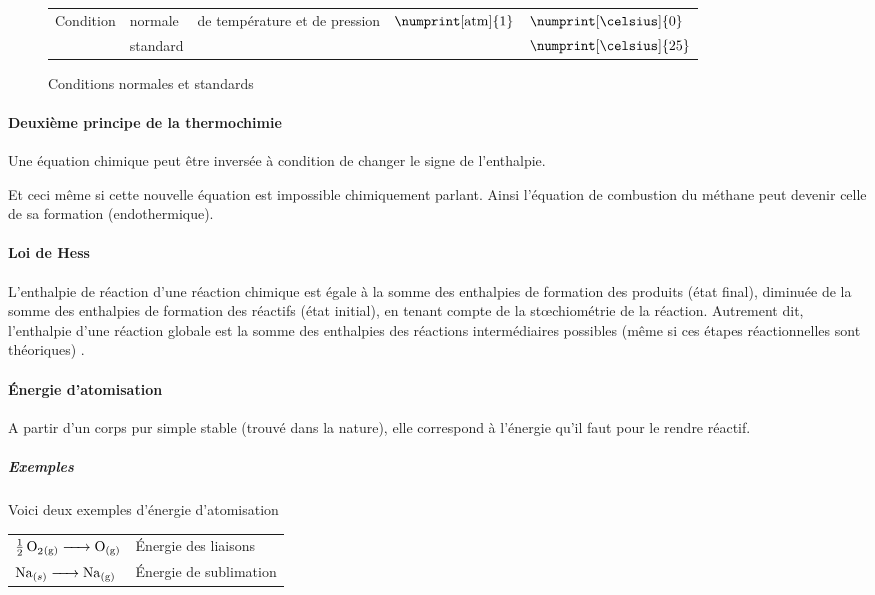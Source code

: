 \begin{figure}[h!]
	\begin{center}
		\begin{tabular}{|lllll|}
			\hline
			\multirow{2}{*}{Condition} & normale & \multirow{2}{*}{de température et de pression} & \multirow{2}{*}{$\numprint[\atm]{1}$} & $\numprint[\celsius]{0}$\\
			& standard & & & $\numprint[\celsius]{25}$\\
			\hline
		\end{tabular}
	\end{center}
	\label{fig:cntp}
	\caption{Conditions normales et standards}
\end{figure}

\paragraph{Deuxième principe de la thermochimie}
Une équation chimique peut être inversée à condition de changer le signe de l'enthalpie.

Et ceci même si cette nouvelle équation est impossible chimiquement parlant.
Ainsi l'équation de combustion du méthane peut devenir celle de sa formation (endothermique).


\paragraph{Loi de Hess}
L'enthalpie de réaction d'une réaction chimique est égale à la somme des enthalpies
de formation des produits (état final), diminuée de la somme des enthalpies de formation des
réactifs (état initial), en tenant compte de la st\oe{}chiométrie de la réaction.
Autrement dit, l'enthalpie d'une réaction globale est la somme des enthalpies des réactions intermédiaires possibles (même si ces étapes réactionnelles sont théoriques) \cite[pp.~32,33]{legras}.

\paragraph{\'Energie d'atomisation}
A partir d'un corps pur simple stable (trouvé dans la nature), elle correspond à l'énergie qu'il faut pour le rendre réactif.

\subparagraph{Exemples}
Voici deux exemples d'énergie d'atomisation
\begin{center}
	\begin{tabular}{ll}
		$\ce{1/2O2\gaz} \ce{-> O\gaz}$ & \'Energie des liaisons\\
		$\ce{Na}_{(s)} \ce{-> Na\gaz}$ & \'Energie de sublimation
	\end{tabular}
\end{center}

